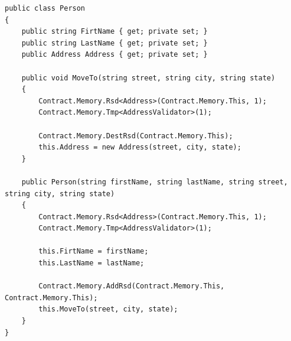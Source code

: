 \documentclass[12pt,a4paper]{article}
\begin{document}
			\begin{footnotesize}
			\begin{lstlisting}[caption=Clase Person]
public class Person
{
	public string FirtName { get; private set; }
	public string LastName { get; private set; }
	public Address Address { get; private set; }

	public void MoveTo(string street, string city, string state)
	{
		Contract.Memory.Rsd<Address>(Contract.Memory.This, 1);
		Contract.Memory.Tmp<AddressValidator>(1);

		Contract.Memory.DestRsd(Contract.Memory.This);
		this.Address = new Address(street, city, state);
	}

	public Person(string firstName, string lastName, string street, string city, string state)
	{
		Contract.Memory.Rsd<Address>(Contract.Memory.This, 1);
		Contract.Memory.Tmp<AddressValidator>(1);

		this.FirtName = firstName;
		this.LastName = lastName;

		Contract.Memory.AddRsd(Contract.Memory.This, Contract.Memory.This);
		this.MoveTo(street, city, state);
	}
}
			\end{lstlisting}
			\end{footnotesize}
\end{document}
